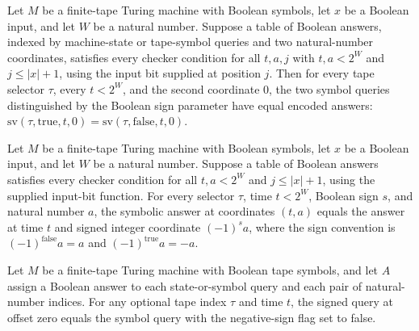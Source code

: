 \begin{theorem}
\label{Complexity.Meyer.sv_negZero}
\leanok
{}
Let $M$ be a finite-tape Turing machine with Boolean symbols, let $x$ be a Boolean
input, and let $W$ be a natural number. Suppose a table of Boolean answers, indexed by
machine-state or tape-symbol queries and two natural-number coordinates, satisfies every
checker condition for all $t,a,j$ with $t,a<2^W$ and $j\le |x|+1$, using the input bit
supplied at position $j$. Then for every tape selector $\tau$, every $t<2^W$, and the
second coordinate $0$, the two symbol queries distinguished by the Boolean sign
parameter have equal encoded answers:
$\mathrm{sv}(\tau,\mathrm{true},t,0)=\mathrm{sv}(\tau,\mathrm{false},t,0)$.
\end{theorem}

\begin{theorem}
\label{Complexity.Meyer.sv_sgn}
\leanok
{}
Let $M$ be a finite-tape Turing machine with Boolean symbols, let $x$ be a Boolean
input, and let $W$ be a natural number. Suppose a table of Boolean answers satisfies
every checker condition for all $t,a<2^W$ and $j\le |x|+1$, using the supplied input-bit
function. For every selector $\tau$, time $t<2^W$, Boolean sign $s$, and natural number
$a$, the symbolic answer at coordinates $(t,a)$ equals the answer at time $t$ and signed
integer coordinate $(-1)^s a$, where the sign convention is $(-1)^{\mathrm{false}}a=a$
and $(-1)^{\mathrm{true}}a=-a$.
\end{theorem}

\begin{theorem}
\label{Complexity.Meyer.cX_zero}
\leanok
{}
Let $M$ be a finite-tape Turing machine with Boolean tape symbols, and let $A$ assign a
Boolean answer to each state-or-symbol query and each pair of natural-number indices.
For any optional tape index $\tau$ and time $t$, the signed query at offset zero equals
the symbol query with the negative-sign flag set to false.
\end{theorem}

